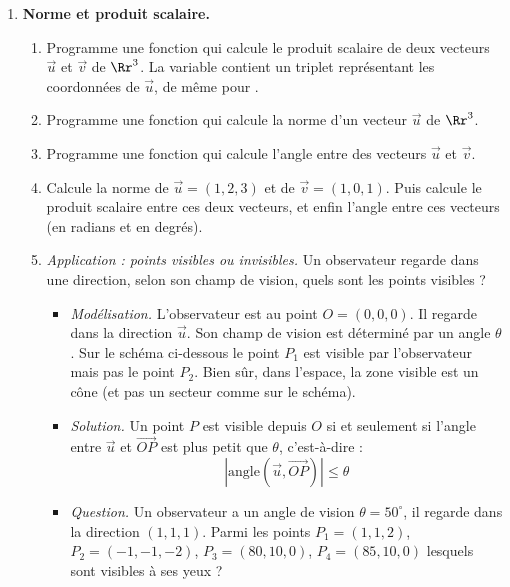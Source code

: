\documentclass[11pt,class=report,crop=false]{standalone}
\begin{document}
\begin{activite}[Vecteurs]
	
	
	\begin{enumerate}
	\item \textbf{Norme et produit scalaire.}
	\begin{enumerate}
		\item Programme une fonction  qui calcule le produit scalaire de deux vecteurs $\vec u$ et $\vec v$ de $\Rr^3$. La variable  contient un triplet  représentant les coordonnées de $\vec u$, de même pour .
		
		\item Programme une fonction  qui calcule la norme d'un vecteur $\vec u$ de $\Rr^3$. 
		
		\item Programme une fonction  qui calcule l'angle entre des vecteurs $\vec u$ et $\vec v$.
		
		\item Calcule la norme de $\vec u = (1,2,3)$ et de $\vec v = (1,0,1)$. Puis calcule le produit scalaire entre ces deux vecteurs, et enfin l'angle entre ces vecteurs (en radians et en degrés).
		
		
		\item \emph{Application : points visibles ou invisibles.}
		Un observateur regarde dans une direction, selon son champ de vision, quels sont les points visibles ?
			
		\begin{itemize}	
			\item \emph{Modélisation.} L'observateur est au point $O=(0,0,0)$. Il regarde dans la direction $\vec u$. Son champ de vision est déterminé par un angle $\theta$. Sur le schéma ci-dessous le point $P_1$ est visible par l'observateur mais pas le point $P_2$. Bien sûr, dans l'espace, la zone visible est un cône (et pas un secteur comme sur le schéma).
		
		
			\item \emph{Solution.} 
			Un point $P$ est visible depuis $O$ si et seulement si l'angle entre  $\vec u$ et $\overrightarrow{OP}$ est plus petit que $\theta$, c'est-à-dire :
			$$\left| \text{angle}(\vec u,\overrightarrow{OP}) \right| \le \theta$$
			
			\item \emph{Question.} Un observateur a un angle de vision $\theta = 50^\circ$, il regarde dans la direction $(1,1,1)$. Parmi les points 
			$P_1=(1,1,2)$, $P_2=(-1,-1,-2)$, $P_3=(80,10,0)$, $P_4=(85,10,0)$ lesquels sont visibles à ses yeux ?
			

\end{itemize}
\end{enumerate}
\end{enumerate}
\end{activite}
\end{document}
